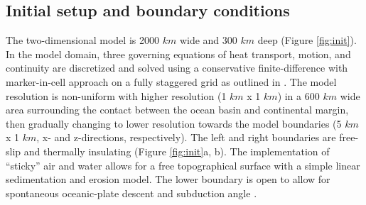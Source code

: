 \hypertarget{initial-setup-and-boundary-conditions}{%
\subsection{Initial setup and boundary conditions}\label{initial-setup-and-boundary-conditions}}

The two-dimensional model is 2000 \(km\) wide and 300 \(km\) deep (Figure \ref{fig:init}). In the model domain, three governing equations of heat transport, motion, and continuity are discretized and solved using a conservative finite-difference with marker-in-cell approach on a fully staggered grid as outlined in \citet{Gerya2003}. The model resolution is non-uniform with higher resolution (1 \(km\) x 1 \(km\)) in a 600 \(km\) wide area surrounding the contact between the ocean basin and continental margin, then gradually changing to lower resolution towards the model boundaries (5 \(km\) x 1 \(km\), x- and z-directions, respectively). The left and right boundaries are free-slip and thermally insulating (Figure \ref{fig:init}a, b). The implementation of ``sticky'' air and water allows for a free topographical surface with a simple linear sedimentation and erosion model. The lower boundary is open to allow for spontaneous oceanic-plate descent and subduction angle \citep{Burg2005}.


